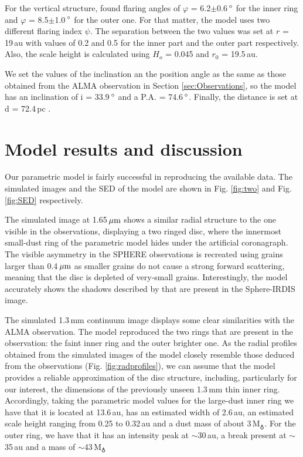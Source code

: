 \documentclass[letters, usenatbib]{mnras}
\begin{document}
For the vertical structure, \citet{dOrazi} found flaring angles of $\varphi$ = 6.2$\pm$0.6\,$\hbox{$^\circ$}$ for the inner ring and $\varphi$ = 8.5$\pm$1.0\,$\hbox{$^\circ$}$ for the outer one. For that matter, the model uses two different flaring index $\psi$. The separation between the two values was set at $r$ = 19\,au with values of 0.2 and 0.5 for the inner part and the outer part respectively. Also, the scale height is calculated using $H_o$ = 0.045 and $r_0$ = 19.5\,au.

We set the values of the inclination an the position angle as the same as those obtained from the ALMA observation in Section \ref{sec:Observations}, so the model has an inclination of i = 33.9\,$\hbox{$^\circ$}$ and a P.A. = 74.6\,$\hbox{$^\circ$}$. Finally, the distance is set at d = 72.4\,pc \citep{Gaia}.

\section{Model results and discussion} \label{sec:results}

Our parametric model is fairly successful in reproducing the available data. The simulated images and the SED of the model are shown in Fig. \ref{fig:two} and Fig. \ref{fig:SED} respectively.

The simulated image at 1.65\,$\hbox{$\mu$m}$ shows a similar radial structure to the one visible in the observations, displaying a two ringed disc, where the innermost small-dust ring of the parametric model hides under the artificial coronagraph. The visible asymmetry in the SPHERE observations is recreated using grains larger than 0.4\,$\hbox{$\mu$m}$ as smaller grains do not cause a strong forward scattering, meaning that the disc is depleted of very-small grains. Interestingly, the model accurately shows the shadows described by \citet{dOrazi} that are present in the Sphere-IRDIS image.

The simulated 1.3\,mm continuum image displays some clear similarities with the ALMA observation. The model reproduced the two rings that are present in the observation: the faint inner ring and the outer brighter one. As the radial profiles obtained from the simulated images of the model closely resemble those deduced from the observations (Fig. \ref{fig:radprofiles}), we can assume that the model provides a reliable approximation of the disc structure, including, particularly for our interest, the dimensions of the previously unseen 1.3\,mm thin inner ring. Accordingly, taking the parametric model values for the large-dust inner ring we have that it is located at 13.6\,au, has an estimated width of 2.6\,au, an estimated scale height ranging from 0.25 to 0.32\,au and a dust mass of about 3\,M$_{\earth}$. For the outer ring, we have that it has an intensity peak at $\sim$30\,au, a break present at $\sim$35\,au and a mass of $\sim$43\,M$_{\earth}$
\end{document}
